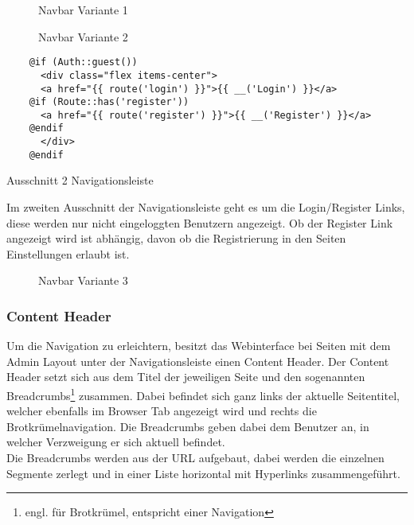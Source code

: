 \begin{figure}[H]
  \centering
  \caption{Navbar Variante 1}
\end{figure}

\begin{figure}[H]
  \centering
  \caption{Navbar Variante 2}
\end{figure}

\begin{listing}[H]
  \begin{verbatim}
    @if (Auth::guest())
      <div class="flex items-center">
      <a href="{{ route('login') }}">{{ __('Login') }}</a>
    @if (Route::has('register'))
      <a href="{{ route('register') }}">{{ __('Register') }}</a>
    @endif
      </div>
    @endif
  \end{verbatim}
  \caption{Ausschnitt 2 Navigationsleiste}
\end{listing}

Im zweiten Ausschnitt der Navigationsleiste geht es um die Login/Register Links, diese werden nur
nicht eingeloggten Benutzern angezeigt. Ob der Register Link angezeigt wird ist
abhängig, davon ob die Registrierung in den Seiten Einstellungen erlaubt ist.

\begin{figure}[H]
  \centering
  \caption{Navbar Variante 3}
\end{figure}

\subsubsection{Content Header}
Um die Navigation zu erleichtern, besitzt das Webinterface bei Seiten mit dem
Admin Layout unter der Navigationsleiste einen Content Header. Der
Content Header setzt sich aus dem Titel der jeweiligen Seite und den sogenannten Breadcrumbs\footnote{engl.
für Brotkrümel, entspricht einer Navigation} zusammen. Dabei befindet sich ganz
links der aktuelle Seitentitel, welcher ebenfalls im Browser Tab angezeigt wird
und rechts die Brotkrümelnavigation. Die Breadcrumbs geben dabei dem Benutzer an,
in welcher Verzweigung er sich aktuell befindet.\\

Die Breadcrumbs werden aus der URL aufgebaut, dabei werden die einzelnen
Segmente zerlegt und in einer Liste horizontal mit Hyperlinks zusammengeführt.  

